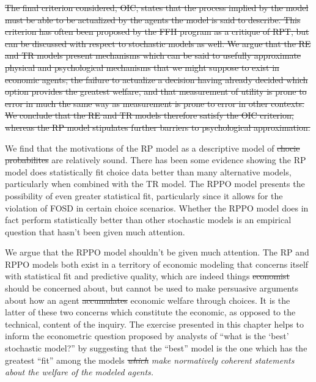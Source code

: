 \documentclass[11pt,a4paper]{report}
\providecommand{\DIFaddtex}[1]{{\protect\color{blue}\uwave{#1}}} %
\providecommand{\DIFdeltex}[1]{{\protect\color{red}\sout{#1}}}                      %
\providecommand{\DIFaddbegin}{} %
\providecommand{\DIFaddend}{} %
\providecommand{\DIFdelbegin}{} %
\providecommand{\DIFdelend}{} %
\providecommand{\DIFadd}[1]{\texorpdfstring{\DIFaddtex{#1}}{#1}} %
\providecommand{\DIFdel}[1]{\texorpdfstring{\DIFdeltex{#1}}{}} %
\newcommand{\DIFscaledelfig}{0.5}
\newlength{\DIFdelgraphicswidth} %
\newlength{\DIFdelgraphicsheight} %
\newcommand{\DIFaddincludegraphics}[2][]{{\color{blue}\fbox{\DIFOincludegraphics[#1]{#2}}}} %
\newcommand{\DIFdelincludegraphics}[2][]{%
\sbox{\DIFdelgraphicsbox}{\DIFOincludegraphics[#1]{#2}}%
\settoboxwidth{\DIFdelgraphicswidth}{\DIFdelgraphicsbox} %
\settoboxtotalheight{\DIFdelgraphicsheight}{\DIFdelgraphicsbox} %
\scalebox{\DIFscaledelfig}{%
\parbox[b]{\DIFdelgraphicswidth}{\usebox{\DIFdelgraphicsbox}\\[-\baselineskip] \rule{\DIFdelgraphicswidth}{0em}}\llap{\resizebox{\DIFdelgraphicswidth}{\DIFdelgraphicsheight}{%
\setlength{\unitlength}{\DIFdelgraphicswidth}%
\begin{picture}(1,1)%
\thicklines\linethickness{2pt} %
{\color[rgb]{1,0,0}\put(0,0){\framebox(1,1){}}}%
{\color[rgb]{1,0,0}\put(0,0){\line( 1,1){1}}}%
{\color[rgb]{1,0,0}\put(0,1){\line(1,-1){1}}}%
\end{picture}%
}\hspace*{3pt}}} %
} %
\DeclareRobustCommand{\DIFaddbegin}{\DIFOaddbegin \let\includegraphics\DIFaddincludegraphics} %
\DeclareRobustCommand{\DIFaddend}{\DIFOaddend \let\includegraphics\DIFOincludegraphics} %
\DeclareRobustCommand{\DIFdelbegin}{\DIFOdelbegin \let\includegraphics\DIFdelincludegraphics} %
\DeclareRobustCommand{\DIFdelend}{\DIFOaddend \let\includegraphics\DIFOincludegraphics} %
\begin{document}
\DIFdelbegin \DIFdel{The final criterion considered, OIC, states that the process implied by the model must be able to be actualized by the agents the model is said to describe.
This criterion has often been proposed by the FFH program as a critique of RPT, but can be discussed with respect to stochastic models as well.
We argue that the RE and TR models present mechanisms which can be said to usefully approximate physical and psychological mechanisms that we might suppose to exist in economic agents; the failure to actualize a decision having already decided which option provides the greatest welfare, and that measurement of utility is prone to error in much the same way as measurement is prone to error in other contexts.
We conclude that the RE and TR models therefore satisfy the OIC criterion, whereas the RP model stipulates further barriers to psychological approximation.
}%

\DIFdelend We find that the motivations of the RP model as a descriptive model of \DIFdelbegin \DIFdel{chocie probabilites }\DIFdelend \DIFaddbegin \DIFadd{choice probabilities }\DIFaddend are relatively sound.
There has been some evidence showing the RP model does statistically fit choice data better than many alternative models, particularly when combined with the TR model.
The RPPO model presents the possibility of even greater statistical fit, particularly since it allows for the violation of FOSD in certain choice scenarios.{\footnotemark}
Whether the RPPO model does in fact perform statistically better than other stochastic models is an empirical question that hasn't been given much attention.

\addtocounter{footnote}{-1}

We argue that the RPPO model shouldn't be given much attention.
The RP and RPPO models both exist in a territory of economic modeling that concerns itself with statistical fit and predictive quality, which are indeed things \DIFdelbegin \DIFdel{economist }\DIFdelend \DIFaddbegin \DIFadd{economists }\DIFaddend should be concerned about, but cannot be used to make persuasive arguments about how an agent \DIFdelbegin \DIFdel{accumulates }\DIFdelend \DIFaddbegin \DIFadd{maintains }\DIFaddend economic welfare through choices.
It is the latter of these two concerns which constitute the economic, as opposed to the technical, content of the inquiry.
The exercise presented in this chapter helps to inform the econometric question proposed by analysts of \enquote{what is the \enquote{best} stochastic model?} by suggesting that the \enquote{best} model is the one which has the greatest \enquote{fit} among the models \textit{\DIFdelbegin \DIFdel{which }\DIFdelend \DIFaddbegin \DIFadd{that }\DIFaddend make normatively coherent statements about the welfare of the modeled agents.}
\end{document}
